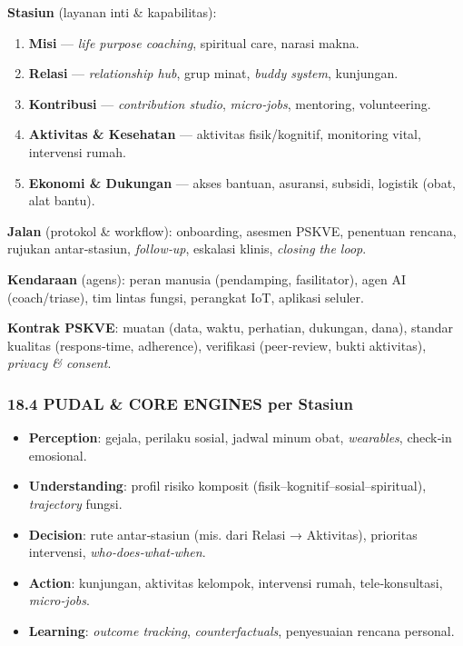 \documentclass[
  letterpaper,
  DIV=11,
  numbers=noendperiod]{scrartcl}
\providecommand{\tightlist}{%
  \setlength{\itemsep}{0pt}\setlength{\parskip}{0pt}}
\begin{document}
\textbf{Stasiun} (layanan inti \& kapabilitas):

\begin{enumerate}
\def\labelenumi{\arabic{enumi}.}
\tightlist
\item
  \textbf{Misi} --- \emph{life purpose coaching}, spiritual care, narasi
  makna.
\item
  \textbf{Relasi} --- \emph{relationship hub}, grup minat, \emph{buddy
  system}, kunjungan.
\item
  \textbf{Kontribusi} --- \emph{contribution studio}, \emph{micro‑jobs},
  mentoring, volunteering.
\item
  \textbf{Aktivitas \& Kesehatan} --- aktivitas fisik/kognitif,
  monitoring vital, intervensi rumah.
\item
  \textbf{Ekonomi \& Dukungan} --- akses bantuan, asuransi, subsidi,
  logistik (obat, alat bantu).
\end{enumerate}

\textbf{Jalan} (protokol \& workflow): onboarding, asesmen PSKVE,
penentuan rencana, rujukan antar‑stasiun, \emph{follow‑up}, eskalasi
klinis, \emph{closing the loop}.

\textbf{Kendaraan} (agens): peran manusia (pendamping, fasilitator),
agen AI (coach/triase), tim lintas fungsi, perangkat IoT, aplikasi
seluler.

\textbf{Kontrak PSKVE}: muatan (data, waktu, perhatian, dukungan, dana),
standar kualitas (respons‑time, adherence), verifikasi (peer‑review,
bukti aktivitas), \emph{privacy \& consent}.

\subsubsection{18.4 PUDAL \& CORE ENGINES per
Stasiun}\label{pudal-core-engines-per-stasiun}

\begin{itemize}
\tightlist
\item
  \textbf{Perception}: gejala, perilaku sosial, jadwal minum obat,
  \emph{wearables}, check‑in emosional.
\item
  \textbf{Understanding}: profil risiko komposit
  (fisik--kognitif--sosial--spiritual), \emph{trajectory} fungsi.
\item
  \textbf{Decision}: rute antar‑stasiun (mis. dari Relasi → Aktivitas),
  prioritas intervensi, \emph{who‑does‑what‑when}.
\item
  \textbf{Action}: kunjungan, aktivitas kelompok, intervensi rumah,
  tele‑konsultasi, \emph{micro‑jobs}.
\item
  \textbf{Learning}: \emph{outcome tracking}, \emph{counterfactuals},
  penyesuaian rencana personal.
\end{itemize}
\end{document}
